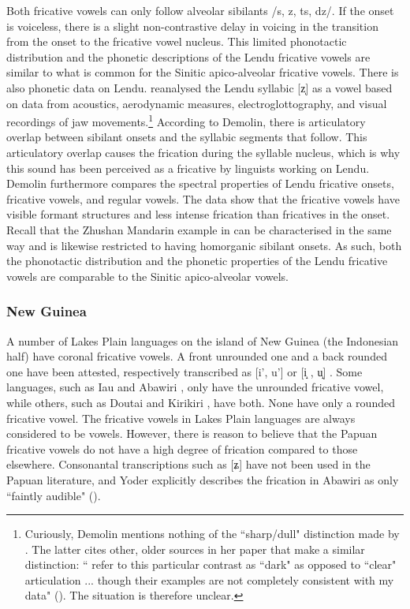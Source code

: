 \documentclass[output=paper,colorlinks,citecolor=brown,chinesefont]{langscibook}
\begin{document}
Both fricative vowels can only follow alveolar sibilants /s, z, ts, dz/. If the onset is voiceless, there is a slight non-contrastive delay in voicing in the transition from the onset to the fricative vowel nucleus. This limited phonotactic distribution and the phonetic descriptions of the Lendu fricative vowels are similar to what is common for the Sinitic apico-alveolar fricative vowels. There is also phonetic data on Lendu. \citet{Demolin_2002} reanalysed the Lendu syllabic [z̩] as a vowel based on data from acoustics, aerodynamic measures, electroglottography, and visual recordings of jaw movements.\footnote{Curiously, Demolin mentions nothing of the ``sharp/dull" distinction made by \citet{Kutsch_Lojenga_1989}. The latter cites other, older sources in her paper that make a similar distinction: ``\citet[30]{Tucker_and_Bryan_1966} refer to this particular contrast as ``dark" as opposed to ``clear" articulation ... though their examples are not completely consistent with my data" (\citeyear[120]{Kutsch_Lojenga_1989}). The situation is therefore unclear.} According to Demolin, there is articulatory overlap between sibilant onsets and the syllabic segments that follow. This articulatory overlap causes the frication during the syllable nucleus, which is why this sound has been perceived as a fricative by linguists working on Lendu. Demolin furthermore compares the spectral properties of Lendu fricative onsets, fricative vowels, and regular vowels. The data show that the fricative vowels have visible formant structures and less intense frication than fricatives in the onset. Recall that the Zhushan Mandarin example in  can be characterised in the same way and is likewise restricted to having homorganic sibilant onsets. As such, both the phonotactic distribution and the phonetic properties of the Lendu fricative vowels are comparable to the Sinitic apico-alveolar vowels.

\subsubsection{New Guinea}
A number of Lakes Plain languages on the island of New Guinea (the Indonesian half) have coronal fricative vowels. A front unrounded one and a back rounded one have been attested, respectively transcribed as [i', u'] \citep{Foley_2018} or [i̝ , u̝] \citep{clouse&clouse_1993}. Some languages, such as Iau and Abawiri \citep{Yoder_2020}, only have the unrounded fricative vowel, while others, such as Doutai and Kirikiri \citep[533]{Foley_2018}, have both. None have only a rounded fricative vowel. The fricative vowels in Lakes Plain languages are always considered to be vowels. However, there is reason to believe that the Papuan fricative vowels do not have a high degree of frication compared to those elsewhere. Consonantal transcriptions such as [ʑ] have not been used in the Papuan literature, and Yoder explicitly describes the frication in Abawiri as only ``faintly audible" (\citeyear[57]{Yoder_2020}).
\end{document}
